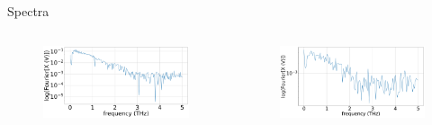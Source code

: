\documentclass[aspectratio=1610, 9pt]{beamer}
\begin{document}
\begin{frame}{Spectra}
  \begin{columns}
    \begin{column}{.5\textwidth}
  \begin{figure}
    \includegraphics[width=\textwidth]{images/2_11_30_20normallog(FX).pdf}
  \end{figure}
  \end{column}
  \begin{column}{.5\textwidth}
    \begin{figure}
      \includegraphics[width=\textwidth]{images/GaP14_55_42normallog(FX).pdf}
    \end{figure}    
  \end{column}
  \end{columns}
\end{frame}
\end{document}
